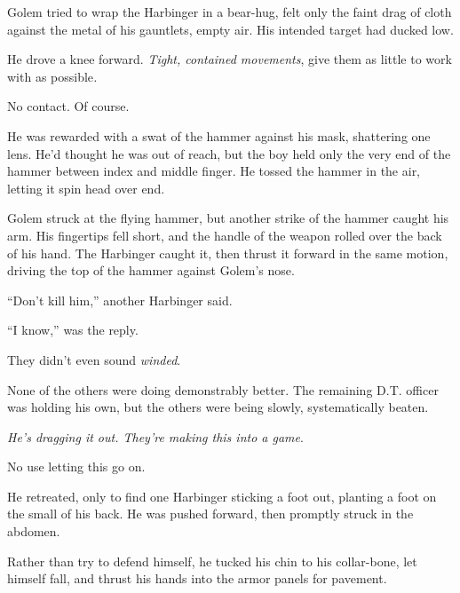 Golem tried to wrap the Harbinger in a bear-hug, felt only the faint drag of cloth against the metal of his gauntlets, empty air.  His intended target had ducked low.



He drove a knee forward.  \emph{Tight, contained movements}, give them as little to work with as possible\emph{.}



No contact.  Of course.



He was rewarded with a swat of the hammer against his mask, shattering one lens.  He'd thought he was out of reach, but the boy held only the very end of the hammer between index and middle finger.  He tossed the hammer in the air, letting it spin head over end.



Golem struck at the flying hammer, but another strike of the hammer caught his arm.  His fingertips fell short, and the handle of the weapon rolled over the back of his hand.  The Harbinger caught it, then thrust it forward in the same motion, driving the top of the hammer against Golem's nose.



``Don't kill him,'' another Harbinger said.



``I know,'' was the reply.



They didn't even sound \emph{winded}.



None of the others were doing demonstrably better.  The remaining D.T. officer was holding his own, but the others were being slowly, systematically beaten.



\emph{He's dragging it out.  They're making this into a game}.



No use letting this go on.



He retreated, only to find one Harbinger sticking a foot out, planting a foot on the small of his back.  He was pushed forward, then promptly struck in the abdomen.



Rather than try to defend himself, he tucked his chin to his collar-bone, let himself fall, and thrust his hands into the armor panels for pavement.



